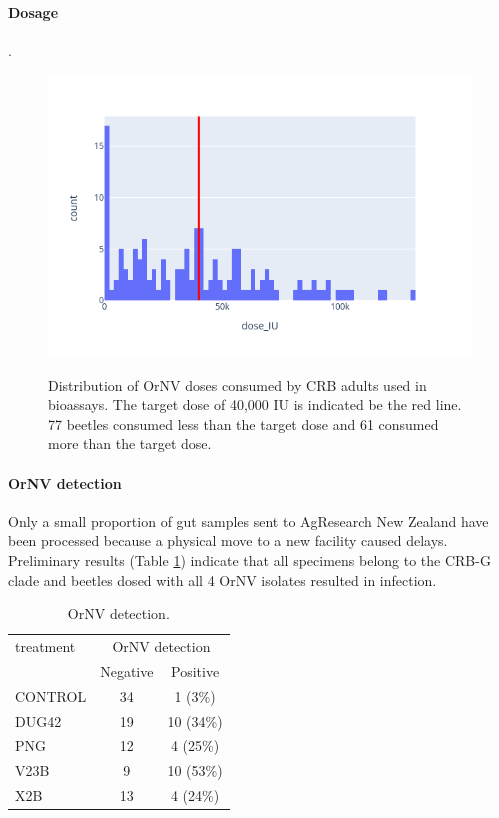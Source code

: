 \documentclass[12pt,letterpaper,english,bibliography=totocnumbered, abstract=on]{scrartcl}
\begin{document}
\clearpage

\paragraph{Dosage}.

\begin{figure}[h]
	\centering
	\caption{Distribution of OrNV doses consumed by CRB adults used in bioassays. The target dose of 40,000 IU is indicated be the red line. 77 beetles consumed less than the target dose and 61 consumed more than the target dose.}
	\includegraphics[width=0.7\linewidth]{images/dosage_distribution}
	\label{fig:dosagedistribution}
\end{figure}



\paragraph{OrNV detection}

Only a small proportion of gut samples sent to AgResearch New Zealand have been processed because a physical move to a new facility caused delays. Preliminary results (Table \ref{ornv detection}) indicate that all specimens belong to the CRB-G clade and beetles dosed with all 4 OrNV isolates resulted in infection.

\begin{table}[H]
	\centering
	\caption{OrNV detection.}
	\label{ornv detection}
	\begin{tabular}{lcc}
		\hline
		treatment  & \multicolumn{2}{c}{OrNV detection} \\ \cline{2-3}
		& Negative & Positive \\
		\hline
		CONTROL    & 34 & 1 (3\%) \\
		DUG42      & 19 & 10 (34\%) \\
		PNG        & 12 & 4 (25\%) \\		
		V23B       & 9  & 10 (53\%) \\
		X2B        & 13 & 4 (24\%) \\
		\hline
	\end{tabular}
\end{table}
\end{document}
